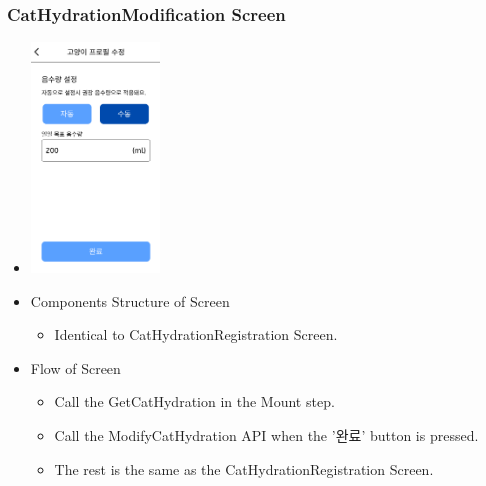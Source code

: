 \documentclass[conference]{IEEEtran}
\begin{document}
\subsubsection{CatHydrationModification Screen}
\begin{itemize}
    \item[] \includegraphics[width=0.27\textwidth]{img/D/21.png}
    \item Components Structure of Screen
    \begin{itemize}
        \item Identical to CatHydrationRegistration Screen.
    \end{itemize}
    \item Flow of Screen
    \begin{itemize}
        \item Call the GetCatHydration in the Mount step.
        \item Call the ModifyCatHydration API when the '완료' button is pressed.
        \item The rest is the same as the CatHydrationRegistration Screen.
    \end{itemize}
\end{itemize}
\newpage
\end{document}
